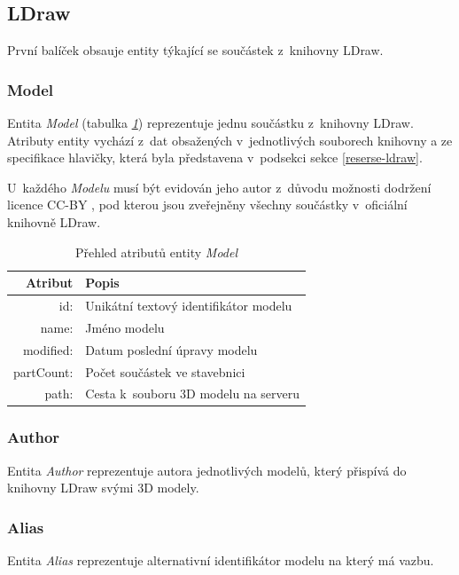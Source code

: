 \subsection{LDraw}
První balíček obsauje entity týkající se součástek z~knihovny LDraw.

\subsubsection*{Model}
  Entita \textit{Model} (tabulka \emph{\ref{table:entity:model}}) reprezentuje jednu součástku z~knihovny LDraw. Atributy entity vychází z~dat obsažených v~jednotlivých souborech knihovny a ze specifikace hlavičky, která byla představena v~podsekci \emph{} sekce \ref{reserse-ldraw}.
    
  U~každého \textit{Modelu} musí být evidován jeho autor z~důvodu možnosti dodržení licence \gls{CC-BY} \cite{CC-BY}, pod kterou jsou zveřejněny všechny součástky v~oficiální knihovně LDraw. 
  
  \begin{table}[th!]
  \centering
  \caption{Přehled atributů entity \textit{Model}}
  \label{table:entity:model}
  \begin{tabularx}{\textwidth}{@{}rX@{}}
  \toprule
  Atribut & Popis
  \\ 
  \midrule
  id: & Unikátní textový identifikátor modelu
  \\
  name: & Jméno modelu 
  \\
  modified: & Datum poslední úpravy modelu 
  \\
  partCount: & Počet součástek ve stavebnici
  \\
  path: & Cesta k~souboru 3D modelu na serveru
  \\
  \bottomrule
  \end{tabularx}
  \end{table}

\subsubsection*{Author}
Entita \textit{Author} reprezentuje autora jednotlivých modelů, který přispívá do knihovny LDraw svými 3D modely. 
  
\subsubsection*{Alias}
Entita \textit{Alias} reprezentuje alternativní identifikátor modelu na který má vazbu. 

